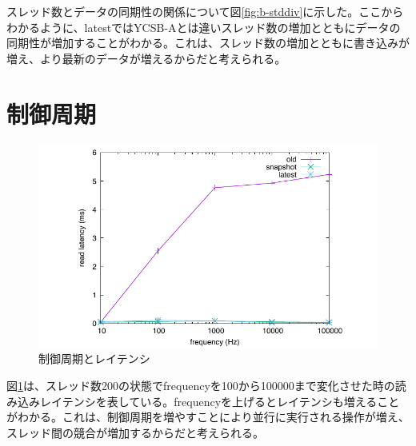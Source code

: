 \documentclass[a4paper]{jreport}	%
\begin{document}
スレッド数とデータの同期性の関係について図\ref{fig:b-stddiv}に示した。ここからわかるように、latestではYCSB-Aとは違いスレッド数の増加とともにデータの同期性が増加することがわかる。これは、スレッド数の増加とともに書き込みが増え、より最新のデータが増えるからだと考えられる。

\section{制御周期}

\begin{figure}[h] 
\centering
\includegraphics[width=17cm]{latency-frequency.pdf}
\caption{制御周期とレイテンシ}
\label{fig:latency-frequency}
\end{figure}


図\ref{fig:latency-frequency}は、スレッド数200の状態でfrequencyを100から100000まで変化させた時の読み込みレイテンシを表している。frequencyを上げるとレイテンシも増えることがわかる。これは、制御周期を増やすことにより並行に実行される操作が増え、スレッド間の競合が増加するからだと考えられる。



%
%
\end{document}
